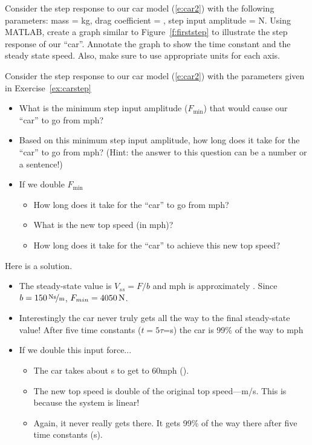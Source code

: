 \begin{ex}
\label{ex:carstep}
Consider the step response to our car model (\ref{e:car2}) with the following parameters: mass = \unit[800]{kg}, drag coefficient = , step input amplitude = \unit[15,000]{N}.  Using MATLAB, create a graph similar to Figure~\ref{f:firststep} to illustrate the step response of our ``car''.  Annotate the graph to show the time constant and the steady state speed.  Also, make sure to use appropriate units for each axis.
\end{ex}

\begin{ex}
Consider the step response to our car model (\ref{e:car2}) with the parameters given in Exercise~\ref{ex:carstep}
\begin{itemize}
\item What is the minimum step input amplitude ($F_{\mathrm{min}}$) that would cause our ``car'' to go from \unit[0--60]{mph}?
\item Based on this minimum step input amplitude, how long does it take for the ``car'' to go from \unit[0--60]{mph}? (Hint: the answer to this question can be a number or a sentence!)
\item If we double $F_{\mathrm{min}}$
 \begin{itemize}
 \item How long does it take for the ``car'' to go from \unit[0--60]{mph}?
 \item What is the new top speed (in mph)?
 \item How long does it take for the ``car'' to achieve this new top speed?
 \end{itemize}
\end{itemize}
\end{ex}

\ifsolutions
\begin{soln}
Here is a solution.
\begin{itemize}
\item The steady-state value is $V_{ss}=F/b$ and \unit[60]{mph} is approximately .  Since $b=\unitfrac[150]{Ns}{m}$, $F_{min}=\unit[4050]{N}$.
\item Interestingly the car never truly gets all the way to the final steady-state value!  After five time constants ($t=5\tau$=\unit[25]{s}) the car is 99\% of the way to \unit[60]{mph}
\item If we double this input force...
\begin{itemize}
\item The car takes about \unit[4]{s} to get to \unit{60}{mph} ().
\item The new top speed is double of the original top speed---\unit[120]{m/s}.  This is because the system is linear!
\item Again, it never really gets there.  It gets 99\% of the way there after five time constants (\unit[25]{s}).
\end{itemize}
\end{itemize}
\end{soln}
\fi
